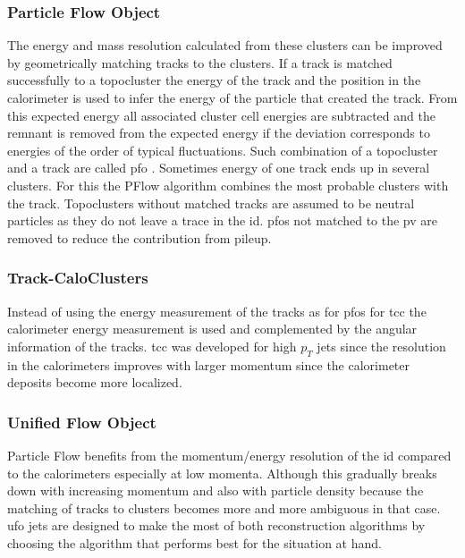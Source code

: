 \subsubsection*{Particle Flow Object}
The energy and mass resolution calculated from these clusters can be improved by geometrically matching tracks to the clusters. If a track is matched successfully to a topocluster the energy of the track and the position in the calorimeter is used to infer the energy of the particle that created the track. From this expected energy all associated cluster cell energies are subtracted and the remnant is removed from the expected energy if the deviation corresponds to energies of the order of typical fluctuations. Such combination of a topocluster and a track are called \ac{pfo} \citep{aaboud2017jet}. Sometimes energy of one track ends up in several clusters. For this the PFlow algorithm combines the most probable clusters with the track. Topoclusters without matched tracks are assumed to be neutral particles as they do not leave a trace in the \ac{id}. \ac{pfo}s not matched to the \ac{pv} are removed to reduce the contribution from pileup.

\subsubsection*{Track-CaloClusters}
Instead of using the energy measurement of the tracks as for \acp{pfo} for \ac{tcc} the calorimeter energy measurement is used and complemented by the angular information of the tracks. \ac{tcc} was developed for high $p_T$ jets since the resolution in the calorimeters improves with larger momentum since the calorimeter deposits become more localized.
 
\subsubsection*{Unified Flow Object}
Particle Flow benefits from the momentum/energy resolution of the \ac{id} compared to the calorimeters especially at low momenta. Although this gradually breaks down with increasing momentum and also with particle density because the matching of tracks to clusters becomes more and more ambiguous in that case. \ac{ufo} jets are designed to make the most of both reconstruction algorithms by choosing the algorithm that performs best for the situation at hand.

